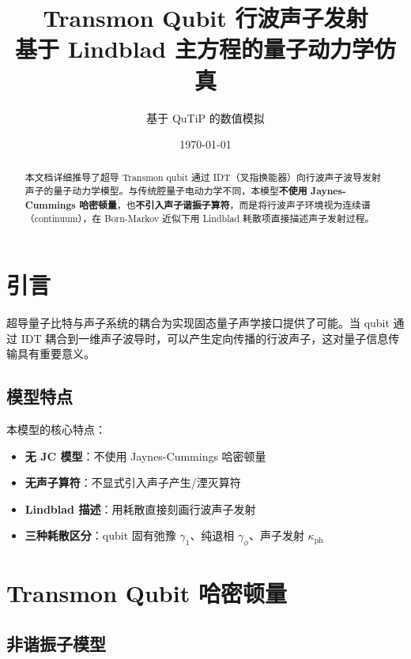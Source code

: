 \documentclass[12pt,a4paper]{article}
\title{\textbf{Transmon Qubit 行波声子发射}\\[0.5em]
\large 基于 Lindblad 主方程的量子动力学仿真}
\author{基于 QuTiP 的数值模拟}
\date{\today}
\theoremstyle{definition}
\begin{document}
\maketitle

\begin{abstract}
本文档详细推导了超导 Transmon qubit 通过 IDT（叉指换能器）向行波声子波导发射声子的量子动力学模型。与传统腔量子电动力学不同，本模型\textbf{不使用 Jaynes-Cummings 哈密顿量}，也\textbf{不引入声子谐振子算符}，而是将行波声子环境视为连续谱（continuum），在 Born-Markov 近似下用 Lindblad 耗散项直接描述声子发射过程。
\end{abstract}

\tableofcontents
\newpage

\section{引言}

超导量子比特与声子系统的耦合为实现固态量子声学接口提供了可能。当 qubit 通过 IDT 耦合到一维声子波导时，可以产生定向传播的行波声子，这对量子信息传输具有重要意义。

\subsection{模型特点}

本模型的核心特点：
\begin{itemize}
    \item \textbf{无 JC 模型}：不使用 Jaynes-Cummings 哈密顿量
    \item \textbf{无声子算符}：不显式引入声子产生/湮灭算符
    \item \textbf{Lindblad 描述}：用耗散直接刻画行波声子发射
    \item \textbf{三种耗散区分}：qubit 固有弛豫 $\gamma_1$、纯退相 $\gamma_\phi$、声子发射 $\kappa_{\text{ph}}$
\end{itemize}

\section{Transmon Qubit 哈密顿量}

\subsection{非谐振子模型}
\end{document}
